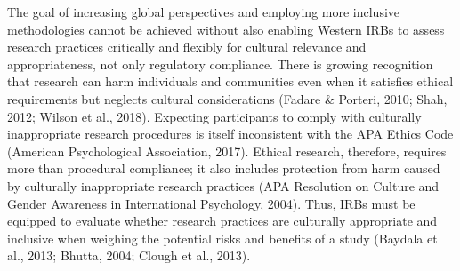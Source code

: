 \documentclass[
  11pt,
]{book}
\begin{document}
The goal of increasing global perspectives and employing more inclusive methodologies cannot be achieved without also enabling Western IRBs to assess research practices critically and flexibly for cultural relevance and appropriateness, not only regulatory compliance. There is growing recognition that research can harm individuals and communities even when it satisfies ethical requirements but neglects cultural considerations (Fadare \& Porteri, 2010; Shah, 2012; Wilson et al., 2018). Expecting participants to comply with culturally inappropriate research procedures is itself inconsistent with the APA Ethics Code (American Psychological Association, 2017). Ethical research, therefore, requires more than procedural compliance; it also includes protection from harm caused by culturally inappropriate research practices (APA Resolution on Culture and Gender Awareness in International Psychology, 2004). Thus, IRBs must be equipped to evaluate whether research practices are culturally appropriate and inclusive when weighing the potential risks and benefits of a study (Baydala et al., 2013; Bhutta, 2004; Clough et al., 2013).
\end{document}
